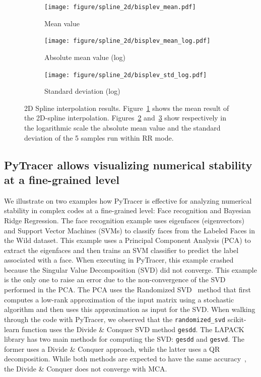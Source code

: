 \documentclass[10pt,journal,compsoc]{IEEEtran}
\newcommand{\pytracer}[0]{PyTracer\xspace}
\begin{document}
\begin{figure}
    \centering
    \begin{subfigure}{.3\linewidth}
        \centering
        \texttt{[image: figure/spline\_2d/bisplev\_mean.pdf]}
        \caption{Mean value}
        \label{fig:bisplev_mean}
    \end{subfigure}
    \begin{subfigure}{.3\linewidth}
        \centering
        \texttt{[image: figure/spline\_2d/bisplev\_mean\_log.pdf]}
        \caption{Absolute mean value (log)}
        \label{fig:bisplev_mean_log}
    \end{subfigure}
    \begin{subfigure}{.3\linewidth}
        \centering
        \texttt{[image: figure/spline\_2d/bisplev\_std\_log.pdf]}
        \caption{Standard deviation (log)}
        \label{fig:bisplev_std_log}
    \end{subfigure}
    \caption{2D Spline interpolation results. Figure~\ref{fig:bisplev_mean}
        shows the mean result of the 2D-spline interpolation.
        Figures~\ref{fig:bisplev_mean_log} and~\ref{fig:bisplev_std_log} show
        respectively in the logarithmic scale the absolute mean value and the
        standard deviation of the 5 samples run within RR mode. }
    \label{fig:spline2d_rr}
\end{figure}

\subsection{\pytracer allows visualizing numerical stability at a fine-grained level}

We illustrate on two examples how PyTracer is effective for analyzing numerical
stability in complex codes at a fine-grained level: Face recognition and
Bayesian Ridge Regression. The face recognition example uses eigenfaces
(eigenvectors) and Support Vector Machines (SVMs) to classify faces from the
Labeled Faces in the Wild dataset. This example uses a Principal Component
Analysis (PCA) to extract the eigenfaces and then trains an SVM classifier to
predict the label associated with a face. When executing in PyTracer, this
example crashed because the Singular Value Decomposition (SVD) did not converge.
This example is the only one to raise an error due to the non-convergence of the
SVD performed in the PCA. The PCA uses the Randomized
SVD~\cite{halko2011finding} method that first computes a low-rank approximation
of the input matrix using a stochastic algorithm and then uses this
approximation as input for the SVD. When walking through the code with PyTracer,
we observed that the \texttt{randomized\_svd} scikit-learn function uses the
Divide \& Conquer SVD method \texttt{gesdd}. The LAPACK library has two main
methods for computing the SVD: \texttt{gesdd} and \texttt{gesvd}. The former
uses a Divide \& Conquer approach, while the latter uses a QR decomposition.
While both methods are expected to have the same
accuracy~\cite{nakatsukasa2013stable}, the Divide \& Conquer does not converge
with MCA.
\end{document}
